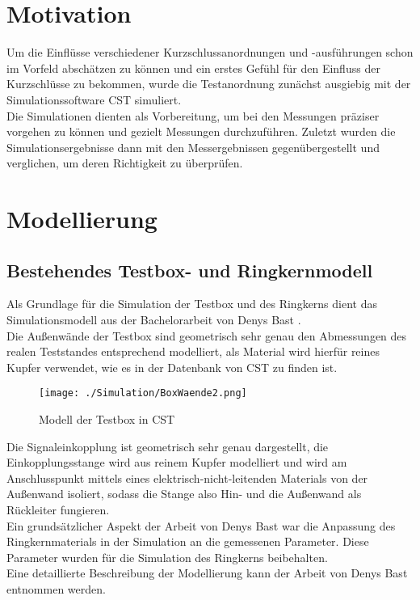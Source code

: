     \section{Motivation}
    Um die Einflüsse verschiedener Kurzschlussanordnungen und -ausführungen schon im Vorfeld abschätzen zu können und ein erstes Gefühl für den Einfluss der Kurzschlüsse zu bekommen, wurde die Testanordnung zunächst ausgiebig mit der Simulationssoftware CST simuliert.\\
    Die Simulationen dienten als Vorbereitung, um bei den Messungen präziser vorgehen zu können und gezielt Messungen durchzuführen. Zuletzt wurden die Simulationsergebnisse dann mit den Messergebnissen gegenübergestellt und verglichen, um deren Richtigkeit zu überprüfen.
    
    \section{Modellierung}
        \subsection{Bestehendes Testbox- und Ringkernmodell}
        Als Grundlage für die Simulation der Testbox und des Ringkerns dient das Simulationsmodell aus der Bachelorarbeit von Denys Bast \cite{bast2017ba}.\\
        Die Außenwände der Testbox sind geometrisch sehr genau den Abmessungen des realen Teststandes entsprechend modelliert, als Material wird hierfür reines Kupfer verwendet, wie es in der Datenbank von CST zu finden ist.
            \begin{figure}[htb]
                \centering
                \texttt{[image: ./Simulation/BoxWaende2.png]}
                \caption{Modell der Testbox in CST}
                \label{fig:BoxCST}
            \end{figure}
    
        Die Signaleinkopplung ist geometrisch sehr genau dargestellt, die Einkopplungsstange wird aus reinem Kupfer modelliert und wird am Anschlusspunkt mittels eines elektrisch-nicht-leitenden Materials von der Außenwand isoliert, sodass die Stange also Hin- und die Außenwand als Rückleiter fungieren.\\
        Ein grundsätzlicher Aspekt der Arbeit von Denys Bast war die Anpassung des Ringkernmaterials in der Simulation an die gemessenen Parameter. Diese Parameter wurden für die Simulation des Ringkerns beibehalten.\\
        Eine detaillierte Beschreibung der Modellierung kann der Arbeit von Denys Bast entnommen werden.
        
